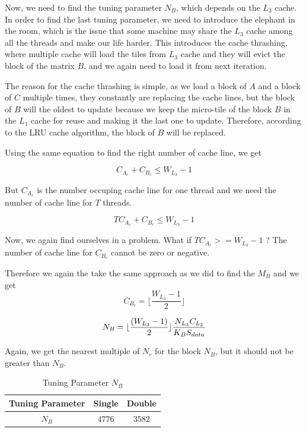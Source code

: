 Now, we need to find the tuning parameter $N_B$, which depends on the $L_3$ cache. In order
to find the last tuning parameter, we need to introduce the elephant in the room, which is
the issue that some machine may share the $L_3$ cache among all the threads and make our
life harder. This introduces the cache thrashing, where multiple cache will load the 
tiles from $L_3$ cache and they will evict the block of the matrix $B$, and we again need
to load it from next iteration.

The reason for the cache thrashing is simple, as we load a block of $A$ and a block 
of $C$ multiple times, they constantly are replacing the cache lines, but the block 
of $B$ will the oldest to update because we keep the micro-tile of the block $B$ in 
the $L_1$ cache for reuse and making it the last one to update. 
Therefore, according to the LRU cache algorithm, the block of $B$ will be replaced.

Using the same equation to find the right number of cache line, we get

\[C_{A_c} + C_{B_c} \leq W_{L_3} - 1\]

But $C_{A_c}$ is the number occuping cache line for one thread and we need the number
of cache line for $T$ threads.

\[TC_{A_c} + C_{B_c} \leq W_{L_3} - 1\]

Now, we again find ourselves in a problem. What if $TC_{A_c} >= W_{L_3} - 1$ ? The number of
cache line for $C_{B_c}$ cannot be zero or negative.

Therefore we again the take the same approach as we did to find the $M_B$ and we get
\[C_{B_c} = \lfloor \frac{ W_{L_3} - 1 }{2} \rfloor \]

\[
    N_B = \lfloor \frac{(W_{L_3} - 1)}{2} \rfloor \frac{N_{L_3} C_{L_3}}{K_B S_{data}}\\
\]

Again, we get the nearest multiple of $N_r$ for the block $N_B$, but it should not be
greater than $N_B$.

\begin{table}[ht]
    \centering
    \caption{Tuning Parameter $N_B$}
    \begin{tabular}{|c|c|c|}
        \hline
        \textbf{Tuning Parameter} & \textbf{Single} & \textbf{Double}\\
        \hline
        $N_B$   & $4776$ & $3582$ \\
        \hline
    \end{tabular}
\end{table}

